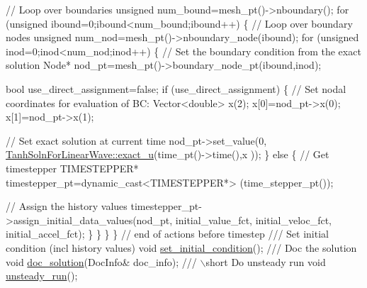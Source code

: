 \begin{DoxyCodeInclude}
   \textcolor{comment}{// Loop over boundaries}
   \textcolor{keywordtype}{unsigned} num\_bound=mesh\_pt()->nboundary();
   \textcolor{keywordflow}{for} (\textcolor{keywordtype}{unsigned} ibound=0;ibound<num\_bound;ibound++)
    \{
     \textcolor{comment}{// Loop over boundary nodes}
     \textcolor{keywordtype}{unsigned} num\_nod=mesh\_pt()->nboundary\_node(ibound);
     \textcolor{keywordflow}{for} (\textcolor{keywordtype}{unsigned} inod=0;inod<num\_nod;inod++)
      \{
       \textcolor{comment}{// Set the boundary condition from the exact solution}
       Node* nod\_pt=mesh\_pt()->boundary\_node\_pt(ibound,inod);

       \textcolor{keywordtype}{bool} use\_direct\_assignment=\textcolor{keyword}{false};
       \textcolor{keywordflow}{if} (use\_direct\_assignment)
        \{
         \textcolor{comment}{// Set nodal coordinates for evaluation of BC:}
         Vector<double> x(2);
         x[0]=nod\_pt->x(0);
         x[1]=nod\_pt->x(1);
         
         \textcolor{comment}{// Set exact solution at current time}
         nod\_pt->set\_value(0,
                           \hyperlink{namespaceTanhSolnForLinearWave_aceea2935b2d3815ce72aae8c9de2b468}{TanhSolnForLinearWave::exact\_u}(time\_pt()->time(),x
      ));
        \}
       \textcolor{keywordflow}{else}
        \{
         \textcolor{comment}{// Get timestepper}
         TIMESTEPPER* timestepper\_pt=\textcolor{keyword}{dynamic\_cast<}TIMESTEPPER*\textcolor{keyword}{>}
          (time\_stepper\_pt());
         
         \textcolor{comment}{// Assign the history values}
         timestepper\_pt->assign\_initial\_data\_values(nod\_pt, 
                                                    initial\_value\_fct,
                                                    initial\_veloc\_fct,
                                                    initial\_accel\_fct);
        \}
      \}
    \}
  \} \textcolor{comment}{// end of actions before timestep}
\textcolor{comment}{}
\textcolor{comment}{ ///  Set initial condition (incl history values)}
\textcolor{comment}{} \textcolor{keywordtype}{void} \hyperlink{classLinearWaveProblem_afb5d327791d8289a8a0a565afc8aee37}{set\_initial\_condition}();
\textcolor{comment}{}
\textcolor{comment}{ /// Doc the solution}
\textcolor{comment}{} \textcolor{keywordtype}{void} \hyperlink{classLinearWaveProblem_a6d9396a693be0479ece9ac1f14f9233a}{doc\_solution}(DocInfo& doc\_info);
\textcolor{comment}{}
\textcolor{comment}{ /// \(\backslash\)short Do unsteady run }
\textcolor{comment}{} \textcolor{keywordtype}{void} \hyperlink{classLinearWaveProblem_a9993365201bfffcc04dd2034f0d3d391}{unsteady\_run}();


\end{DoxyCodeInclude}
